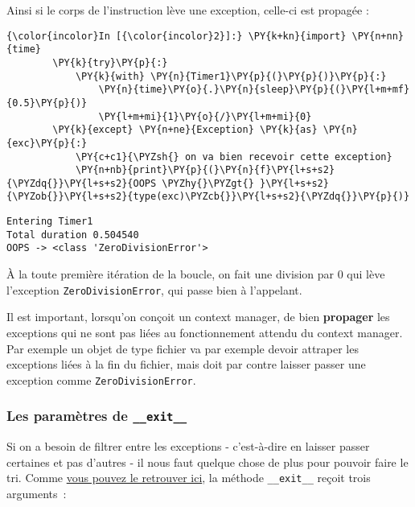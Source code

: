    Ainsi si le corps de l'instruction lève une exception, celle-ci est
propagée :

    \begin{Verbatim}[commandchars=\\\{\},frame=single,framerule=0.3mm,rulecolor=\color{cellframecolor}]
{\color{incolor}In [{\color{incolor}2}]:} \PY{k+kn}{import} \PY{n+nn}{time}
        \PY{k}{try}\PY{p}{:}
            \PY{k}{with} \PY{n}{Timer1}\PY{p}{(}\PY{p}{)}\PY{p}{:}
                \PY{n}{time}\PY{o}{.}\PY{n}{sleep}\PY{p}{(}\PY{l+m+mf}{0.5}\PY{p}{)}
                \PY{l+m+mi}{1}\PY{o}{/}\PY{l+m+mi}{0}
        \PY{k}{except} \PY{n+ne}{Exception} \PY{k}{as} \PY{n}{exc}\PY{p}{:}
            \PY{c+c1}{\PYZsh{} on va bien recevoir cette exception}
            \PY{n+nb}{print}\PY{p}{(}\PY{n}{f}\PY{l+s+s2}{\PYZdq{}}\PY{l+s+s2}{OOPS \PYZhy{}\PYZgt{} }\PY{l+s+s2}{\PYZob{}}\PY{l+s+s2}{type(exc)\PYZcb{}}\PY{l+s+s2}{\PYZdq{}}\PY{p}{)}
\end{Verbatim}


    \begin{Verbatim}[commandchars=\\\{\},frame=single,framerule=0.3mm,rulecolor=\color{cellframecolor}]
Entering Timer1
Total duration 0.504540
OOPS -> <class 'ZeroDivisionError'>
\end{Verbatim}

    À la toute première itération de la boucle, on fait une division par 0
qui lève l'exception \texttt{ZeroDivisionError}, qui passe bien à
l'appelant.

Il est important, lorsqu'on conçoit un context manager, de bien
\textbf{propager} les exceptions qui ne sont pas liées au fonctionnement
attendu du context manager. Par exemple un objet de type fichier va par
exemple devoir attraper les exceptions liées à la fin du fichier, mais
doit par contre laisser passer une exception comme
\texttt{ZeroDivisionError}.

    \hypertarget{les-paramuxe8tres-de-__exit__}{%
\subsubsection{\texorpdfstring{Les paramètres de
\texttt{\_\_exit\_\_}}{Les paramètres de \_\_exit\_\_}}\label{les-paramuxe8tres-de-__exit__}}

    Si on a besoin de filtrer entre les exceptions - c'est-à-dire en laisser
passer certaines et pas d'autres - il nous faut quelque chose de plus
pour pouvoir faire le tri. Comme
\href{https://docs.python.org/3/reference/datamodel.html\#with-statement-context-managers}{vous
pouvez le retrouver ici}, la méthode \texttt{\_\_exit\_\_} reçoit trois
arguments~:

